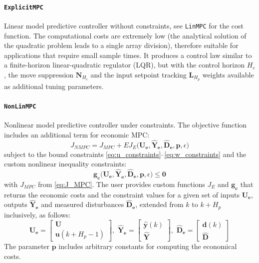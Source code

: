 \paragraph{\textnormal{\texttt{ExplicitMPC}}}
Linear model predictive controller without constraints, see \texttt{LinMPC} for the cost function. The computational costs are extremely low (the analytical solution of the quadratic problem leads to a single array division), therefore suitable for applications that require small sample times. It produces a control law similar to a finite-horizon linear-quadratic regulator (LQR), but with the control horizon $H_c$, the move suppression $\mathbf{N}_{H_c}$ and the input setpoint tracking $\mathbf{L}_{H_p}$ weights available as additional tuning parameters.

\paragraph{\textnormal{\texttt{NonLinMPC}}}
Nonlinear model predictive controller under constraints. The objective function includes an additional term for economic MPC:
\begin{equation}\label{eq:J_NMPC}
J_{\mathit{NMPC}} = J_{\mathit{MPC}} 
    + E J_E\big(\mathbf{U_e}, \mathbf{\hat{Y}_e}, \mathbf{\hat{D}_e}, \mathbf{p}, \epsilon \big)
\end{equation}
subject to the bound constraints \eqref{eq:u_constraints}--\eqref{eq:w_constraints} and the custom nonlinear inequality constraints:
\begin{equation}
\mathbf{g_c}\big(\mathbf{U_e}, \mathbf{\hat{Y}_e}, \mathbf{\hat{D}_e}, \mathbf{p}, \epsilon \big) \le \mathbf{0}
\end{equation}
with $J_{\mathit{MPC}}$ from \eqref{eq:J_MPC}. The user provides custom functions $J_E$ and $\mathbf{g_c}$ that returns the economic costs and the constraint values for a given set of inputs $\mathbf{U_e}$, outputs $\mathbf{\hat{Y}_e}$ and measured disturbances $\mathbf{\hat{D}_e}$, extended from $k$ to $k+H_p$ inclusively, as follows:
\begin{equation}
\mathbf{U_e} = 
\begin{bmatrix}
    \mathbf{U} \\ \mathbf{u}(k+H_p-1)
\end{bmatrix},\,\,
\mathbf{\hat{Y}_e} = 
\begin{bmatrix}
    \mathbf{\hat{y}}(k) \\ \mathbf{\hat{Y}}
\end{bmatrix},\,\,
\mathbf{\hat{D}_e} = 
\begin{bmatrix}
    \mathbf{d}(k) \\ \mathbf{\hat{D}}
\end{bmatrix} 
\end{equation} 
The parameter $\mathbf{p}$ includes arbitrary constants for computing the economical costs. 

